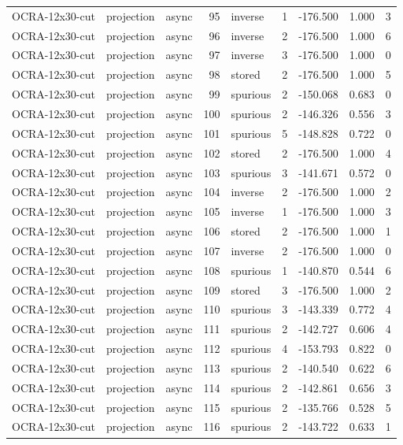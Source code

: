 \begin{tabular}{lllrlrrrr}
OCRA-12x30-cut & projection & async & 95 & inverse & 1 & -176.500 & 1.000 & 3 \\
OCRA-12x30-cut & projection & async & 96 & inverse & 2 & -176.500 & 1.000 & 6 \\
OCRA-12x30-cut & projection & async & 97 & inverse & 3 & -176.500 & 1.000 & 0 \\
OCRA-12x30-cut & projection & async & 98 & stored & 2 & -176.500 & 1.000 & 5 \\
OCRA-12x30-cut & projection & async & 99 & spurious & 2 & -150.068 & 0.683 & 0 \\
OCRA-12x30-cut & projection & async & 100 & spurious & 2 & -146.326 & 0.556 & 3 \\
OCRA-12x30-cut & projection & async & 101 & spurious & 5 & -148.828 & 0.722 & 0 \\
OCRA-12x30-cut & projection & async & 102 & stored & 2 & -176.500 & 1.000 & 4 \\
OCRA-12x30-cut & projection & async & 103 & spurious & 3 & -141.671 & 0.572 & 0 \\
OCRA-12x30-cut & projection & async & 104 & inverse & 2 & -176.500 & 1.000 & 2 \\
OCRA-12x30-cut & projection & async & 105 & inverse & 1 & -176.500 & 1.000 & 3 \\
OCRA-12x30-cut & projection & async & 106 & stored & 2 & -176.500 & 1.000 & 1 \\
OCRA-12x30-cut & projection & async & 107 & inverse & 2 & -176.500 & 1.000 & 0 \\
OCRA-12x30-cut & projection & async & 108 & spurious & 1 & -140.870 & 0.544 & 6 \\
OCRA-12x30-cut & projection & async & 109 & stored & 3 & -176.500 & 1.000 & 2 \\
OCRA-12x30-cut & projection & async & 110 & spurious & 3 & -143.339 & 0.772 & 4 \\
OCRA-12x30-cut & projection & async & 111 & spurious & 2 & -142.727 & 0.606 & 4 \\
OCRA-12x30-cut & projection & async & 112 & spurious & 4 & -153.793 & 0.822 & 0 \\
OCRA-12x30-cut & projection & async & 113 & spurious & 2 & -140.540 & 0.622 & 6 \\
OCRA-12x30-cut & projection & async & 114 & spurious & 2 & -142.861 & 0.656 & 3 \\
OCRA-12x30-cut & projection & async & 115 & spurious & 2 & -135.766 & 0.528 & 5 \\
OCRA-12x30-cut & projection & async & 116 & spurious & 2 & -143.722 & 0.633 & 1 \\

\end{tabular}
